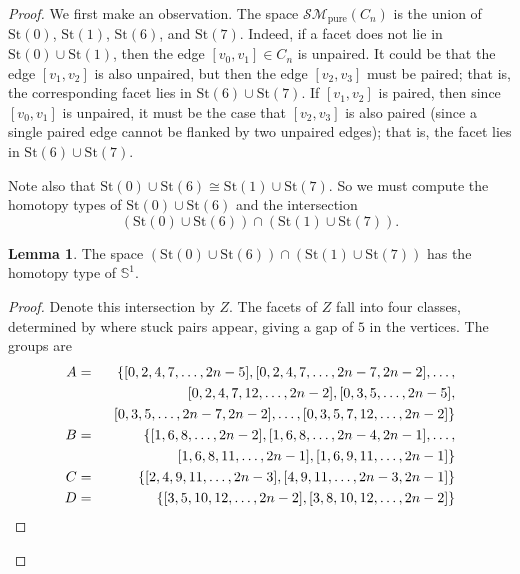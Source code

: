 \documentclass{amsart}
\theoremstyle{definition}
\newtheorem{lemma}[theorem]{Lemma}
\newcommand{\zs}{{\mathbb S}}
\newcommand{\smpure}{{\mathcal{SM}}_{\textrm{pure}}}
\begin{document}
\begin{proof}
We first make an observation. The space $\smpure(C_n)$ is the union of $\text{St}(0)$, $\text{St}(1)$, $\text{St}(6)$, and $\text{St}(7)$. Indeed, if a facet does not lie in $\text{St}(0) \cup \text{St}(1)$, then the edge $[v_0,v_1] \in C_n$ is unpaired. It could be that the edge $[v_1,v_2]$ is also unpaired, but then the edge $[v_2,v_3]$ must be paired; that is, the corresponding facet lies in $\text{St}(6)\cup\text{St}(7)$. If $[v_1,v_2]$ is paired, then since $[v_0,v_1]$ is unpaired, it must be the case that $[v_2,v_3]$ is also paired (since a single paired edge cannot be flanked by two unpaired edges); that is, the facet lies in $\text{St}(6)\cup\text{St}(7)$.

Note also that $\text{St}(0)\cup\text{St}(6) \cong \text{St}(1)\cup\text{St}(7)$. So we must compute the homotopy types of $\text{St}(0)\cup\text{St}(6)$ and the intersection
$$(\text{St}(0)\cup\text{St}(6)) \cap (\text{St}(1)\cup\text{St}(7)).$$

\begin{lemma}\label{lem:intersection}
    The space $(\text{St}(0)\cup\text{St}(6)) \cap (\text{St}(1)\cup\text{St}(7))$ has the homotopy type of $\zs^1$.
\end{lemma}

\begin{proof}
    Denote this intersection by $Z$. The facets of $Z$ fall into four classes, determined by where stuck pairs appear, giving a gap of $5$ in the vertices. The groups are
    \begin{eqnarray*}
        A & = & \{[0,2,4,7,\dots,2n-5],[0,2,4,7,\dots,2n-7,2n-2],\dots, \\
        &  & \hskip 6pt [0,2,4,7,12,\dots,2n-2],[0,3,5,\dots,2n-5], \\
        &  & \hskip 6pt [0,3,5,\dots,2n-7,2n-2],\dots,[0,3,5,7,12,\dots,2n-2]\} \\
        B & = & \{[1,6,8,\dots,2n-2],[1,6,8,\dots,2n-4,2n-1],\dots, \\
        &  &  \hskip 6pt [1,6,8,11,\dots,2n-1], [1,6,9,11,\dots,2n-1]\} \\
        C & = & \{[2,4,9,11,\dots,2n-3],[4,9,11,\dots,2n-3,2n-1]\} \\
        D & = & \{[3,5,10,12,\dots, 2n-2],[3,8,10,12,\dots,2n-2]\}
    \end{eqnarray*}


\end{proof}
\end{proof}
\end{document}
